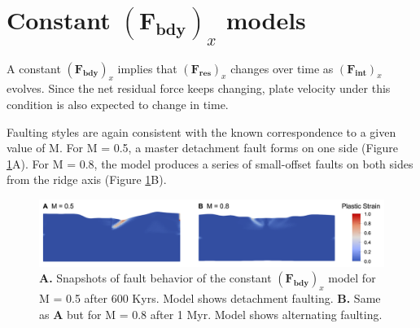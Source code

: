 \documentclass[letterpaper,12pt,notitle]{memphisthesis}                     %
\begin{document}
\section{Constant $(\boldsymbol{F_{bdy}})_x$ models}

A constant $(\boldsymbol{F_{bdy}})_x$ implies that $(\boldsymbol{F_{res}})_x$ changes over time as $(\boldsymbol{F_{int}})_x$ evolves. Since the net residual force keeps changing, plate velocity under this condition is also expected to change in time.

Faulting styles are again consistent with the known correspondence to a given value of M. %
For M = 0.5, a master detachment fault forms on one side (Figure \ref{fig:fbfault}A). For M = 0.8, the model produces a series of small-offset faults on both sides from the ridge axis (Figure \ref{fig:fbfault}B).
%
\begin{figure}[!htb]
	\centering
	\includegraphics[width=0.99\linewidth,trim=8 8 8 8,clip]{./figs/fbfault.png}
	\caption{\textbf{A.} Snapshots of fault behavior of the constant $(\boldsymbol{F_{bdy}})_x$ model for M = 0.5 after 600 Kyrs. Model shows detachment faulting. \textbf{B.} Same as \textbf{A} but for M = 0.8 after 1 Myr. Model shows alternating faulting.}
	\label{fig:fbfault}
\end{figure}
\end{document}
